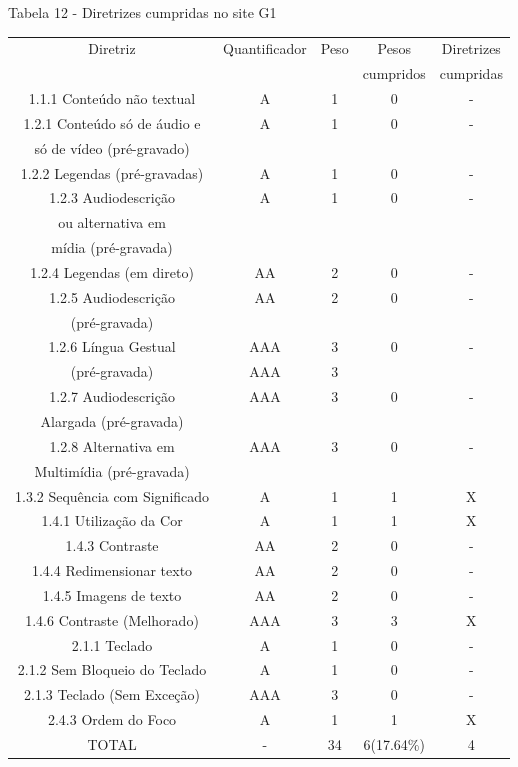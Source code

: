 \documentclass[a4paper]{article}
\begin{document}
\begin{titlepage}
Tabela 12 - Diretrizes cumpridas no site G1\\[-1cm]
\begin{center}
	\fontsize{8pt}{8pt}\selectfont	
	\begin{longtable}{|c|c|c|c|c|}
		\hline
		Diretriz & Quantificador & Peso & Pesos & Diretrizes\\
		& & & cumpridos & cumpridas\\
		\hline
		1.1.1 Conteúdo não textual & A & 1 & 0 & - \\
		\hline
		1.2.1 Conteúdo só de áudio e & A & 1 & 0 & - \\
		só de vídeo (pré-gravado) & & & & \\
		\hline
		1.2.2 Legendas (pré-gravadas) & A & 1 & 0 & - \\
		\hline
		1.2.3 Audiodescrição & A & 1 & 0 & - \\
		ou alternativa em & & & & \\
		mídia (pré-gravada) & & & & \\
		\hline
		1.2.4 Legendas (em direto) & AA & 2 & 0 & - \\
		\hline
		1.2.5 Audiodescrição & AA & 2 & 0 & - \\
		(pré-gravada) & & & & \\
		\hline
		1.2.6 Língua Gestual & AAA & 3 & 0 & - \\
		(pré-gravada) & AAA & 3 & & \\
		\hline
		1.2.7 Audiodescrição & AAA & 3 & 0 & - \\
		Alargada (pré-gravada) & & & & \\
		\hline
		1.2.8 Alternativa em & AAA & 3 & 0 & - \\
		Multimídia (pré-gravada) & & & & \\
		\hline
		1.3.2 Sequência com Significado & A & 1 & 1 & X \\
		\hline
		1.4.1 Utilização da Cor & A & 1 & 1 & X \\
		\hline
		1.4.3 Contraste & AA & 2 & 0 & - \\
		\hline
		1.4.4 Redimensionar texto & AA & 2 & 0 & - \\
		\hline
		1.4.5 Imagens de texto & AA & 2 & 0 & - \\
		\hline
		1.4.6 Contraste (Melhorado) & AAA & 3 & 3 & X \\
		\hline
		2.1.1 Teclado & A & 1 & 0 & - \\
		\hline
		2.1.2 Sem Bloqueio do Teclado & A & 1 & 0 & - \\
		\hline
		2.1.3 Teclado (Sem Exceção) & AAA & 3 & 0 & - \\
		\hline
		2.4.3 Ordem do Foco & A & 1 & 1 & X \\
		\hline
		TOTAL & - & 34 & 6(17.64\%) & 4 \\
		\hline
	\end{longtable}
\end{center}


\end{titlepage}
\end{document}
